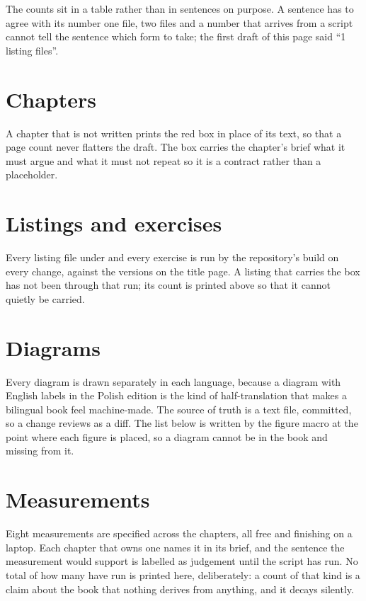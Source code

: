 \noindent
The counts sit in a table rather than in sentences on purpose. A sentence has
to agree with its number \dash{} one file, two files \dash{} and a number that
arrives from a script cannot tell the sentence which form to take; the first
draft of this page said \enquote{1 listing files}.

\section{Chapters}
\label{sec:E-chapters}

A chapter that is not written prints the red \emph{\lblNotWritten} box in
place of its text, so that a page count never flatters the draft. The box
carries the chapter's brief \dash{} what it must argue and what it must not
repeat \dash{} so it is a contract rather than a placeholder.

\section{Listings and exercises}
\label{sec:E-listings}

Every listing file under  and every exercise is run by the
repository's build on every change, against the versions on the title page. A
listing that carries the \emph{\lblVerify} box has not been through that run;
its count is printed above so that it cannot quietly be carried.

\listofexercises

\section{Diagrams}
\label{sec:E-diagrams}

Every diagram is drawn separately in each language, because a diagram with
English labels in the Polish edition is the kind of half-translation that
makes a bilingual book feel machine-made. The source of truth is a text file,
committed, so a change reviews as a diff. The list below is written by the
figure macro at the point where each figure is placed, so a diagram cannot be
in the book and missing from it.

\listofdiagrams

\section{Measurements}
\label{sec:E-measurements}

Eight measurements are specified across the chapters, all free and finishing
on a laptop. Each chapter that owns one names it in its brief, and the sentence
the measurement would support is labelled as judgement until the script has
run. No total of how many have run is printed here, deliberately: a count of
that kind is a claim about the book that nothing derives from anything, and it
decays silently.
